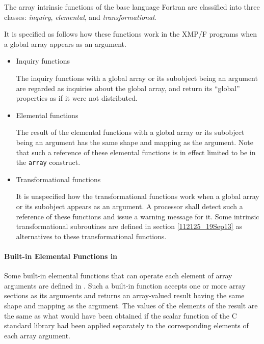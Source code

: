The array intrinsic functions of the base language Fortran are
classified into three classes: {\it inquiry}, {\it elemental}, and
{\it transformational}.

It is specified as follows how these functions work in the XMP/F
programs when a global array appears as an argument.

\begin{itemize}
 \item Inquiry functions

       The inquiry functions with a global array or its subobject
       being an argument are regarded as inquiries about the global
       array, and return its ``global'' properties as if it were not
       distributed.

 \item Elemental functions

       The result of the elemental functions with a global array or
       its subobject being an argument has the same shape and
       mapping as the argument.
%
       Note that such a reference of these elemental functions is in
       effect limited to be in the {\tt array} construct.

 \item Transformational functions

       It is unspecified how the transformational functions work when a
       global array or its subobject appears as an argument.
%
       A processor shall detect such a reference of these functions
       and issue a warning message for it.
%
       Some intrinsic transformational subroutines are defined in
       section \ref{112125_19Sep13} as alternatives to these
       transformational functions.

\end{itemize}


\paragraph{Built-in Elemental Functions in {\XMPC}}
\label{094142_25Sep13}

Some built-in elemental functions that can operate each element of
array arguments are defined in {\XMPC}. Such a built-in function
accepts one or more array sections as its arguments and returns an
array-valued result having the same shape and mapping as the argument.
%
The values of the elements of the result are the same as what would have
been obtained if the scalar function of the C standard library had
been applied separately to the corresponding elements of each array
argument.

